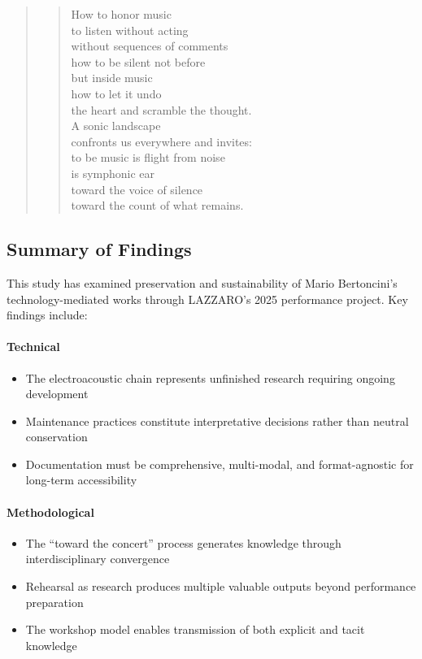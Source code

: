 \begin{quote}
  \begin{sf}
    \small
    \begin{verse}
      How to honor music\\
      to listen without acting\\
      without sequences of comments\\
      how to be silent not before\\
      but inside music\\
      how to let it undo\\
      the heart and scramble the thought.\\
      A sonic landscape\\
      confronts us everywhere and invites:\\
      to be music is flight from noise\\
      is symphonic ear\\
      toward the voice of silence\\
      toward the count of what remains. \cite{silvi2025botteghe}
    \end{verse}
  \end{sf}
\end{quote}

\subsection{Summary of Findings}

This study has examined preservation and sustainability of Mario Bertoncini's 
technology-mediated works through LAZZARO's 2025 performance project. Key 
findings include:

\paragraph{Technical}
\begin{itemize}
  \item The electroacoustic chain represents unfinished research requiring 
  ongoing development
  \item Maintenance practices constitute interpretative decisions rather than 
  neutral conservation
  \item Documentation must be comprehensive, multi-modal, and format-agnostic 
  for long-term accessibility
\end{itemize}

\paragraph{Methodological}
\begin{itemize}
  \item The ``toward the concert'' process generates knowledge through 
  interdisciplinary convergence
  \item Rehearsal as research produces multiple valuable outputs beyond 
  performance preparation
  \item The workshop model enables transmission of both explicit and tacit 
  knowledge
\end{itemize}

